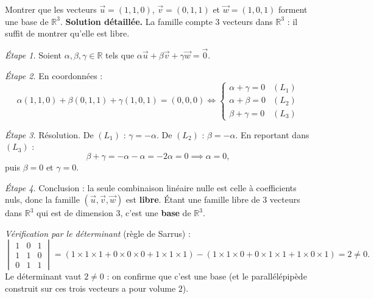 \documentclass[11pt]{article}
\begin{document}
\begin{exoresolu}
Montrer que les vecteurs $\vec{u} = (1, 1, 0)$, $\vec{v} = (0, 1, 1)$ et $\vec{w} = (1, 0, 1)$ forment une base de $\mathbb{R}^3$.
\tcblower
\textbf{Solution détaillée.} La famille compte 3 vecteurs dans $\mathbb{R}^3$ : il suffit de montrer qu'elle est libre.

\emph{Étape 1.} Soient $\alpha, \beta, \gamma \in \mathbb{R}$ tels que $\alpha \vec{u} + \beta \vec{v} + \gamma \vec{w} = \vec{0}$.

\emph{Étape 2.} En coordonnées :
\[ \alpha(1,1,0) + \beta(0,1,1) + \gamma(1,0,1) = (0,0,0) \iff \begin{cases} \alpha + \gamma = 0 & (L_1) \\ \alpha + \beta = 0 & (L_2) \\ \beta + \gamma = 0 & (L_3) \end{cases} \]

\emph{Étape 3.} Résolution. De $(L_1)$ : $\gamma = -\alpha$. De $(L_2)$ : $\beta = -\alpha$. En reportant dans $(L_3)$ :
\[ \beta + \gamma = -\alpha - \alpha = -2\alpha = 0 \implies \alpha = 0, \]
puis $\beta = 0$ et $\gamma = 0$.

\emph{Étape 4.} Conclusion : la seule combinaison linéaire nulle est celle à coefficients nuls, donc la famille $(\vec{u}, \vec{v}, \vec{w})$ est \textbf{libre}. Étant une famille libre de 3 vecteurs dans $\mathbb{R}^3$ qui est de dimension 3, c'est une \textbf{base} de $\mathbb{R}^3$.

\emph{Vérification par le déterminant} (règle de Sarrus) :
\[ \begin{vmatrix} 1 & 0 & 1 \\ 1 & 1 & 0 \\ 0 & 1 & 1 \end{vmatrix} = (1 \times 1 \times 1 + 0 \times 0 \times 0 + 1 \times 1 \times 1) - (1 \times 1 \times 0 + 0 \times 1 \times 1 + 1 \times 0 \times 1) = 2 \neq 0. \]
Le déterminant vaut $2 \neq 0$ : on confirme que c'est une base (et le parallélépipède construit sur ces trois vecteurs a pour volume $2$).
\end{exoresolu}
\end{document}
